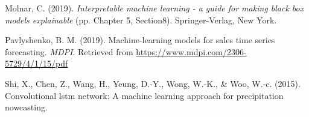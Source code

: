\documentclass[12pt,oneside]{chicagocapstone}
\begin{document}
\leavevmode\hypertarget{ref-molnar2019}{}%
Molnar, C. (2019). \emph{Interpretable machine learning - a guide for making black box models explainable} (pp. Chapter 5, Section8). Springer-Verlag, New York.

\leavevmode\hypertarget{ref-pavlyshenko2019}{}%
Pavlyshenko, B. M. (2019). Machine-learning models for sales time series forecasting. \emph{MDPI}. Retrieved from \url{https://www.mdpi.com/2306-5729/4/1/15/pdf}

\leavevmode\hypertarget{ref-shi2015}{}%
Shi, X., Chen, Z., Wang, H., Yeung, D.-Y., Wong, W.-K., \& Woo, W.-c. (2015). Convolutional lstm network: A machine learning approach for precipitation nowcasting.


\end{document}
